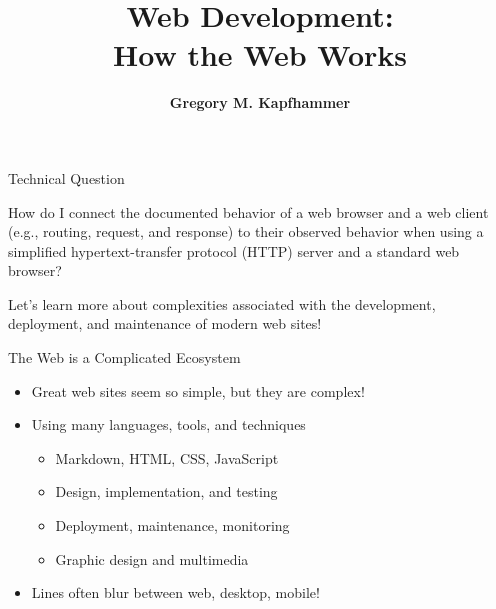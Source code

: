 \documentclass[14pt,aspectratio=169]{beamer}
\title{Web Development: \\ How the Web Works}
\author{{\bf Gregory M. Kapfhammer}}
\institute[shortinst]{{\bf Department of Computer Science, Allegheny College}}
\begin{document}
{
  \begin{frame}
    \titlepage
  \end{frame}
}

%
\begin{frame}{Technical Question}
  \hspace*{.25in}
  \vspace*{.2in}
  \begin{center}
    {\large How do I connect the documented behavior of a web browser and a
      web client (e.g., routing, request, and response) to their observed
      behavior when using a simplified hypertext-transfer protocol (HTTP) server
    and a standard web browser?}
  \end{center}
  \vspace{1ex}
  \begin{center}
    \small Let's learn more about complexities associated with the development,
    deployment, and maintenance of modern web sites!
  \end{center}
\end{frame}

%
\begin{frame}{The Web is a Complicated Ecosystem}
%
  \begin{itemize}
    \item Great web sites seem so simple, but they are complex!
    \item Using many languages, tools, and techniques
      \begin{itemize}
        \item Markdown, HTML, CSS, JavaScript
        \item Design, implementation, and testing
        \item Deployment, maintenance, monitoring
        \item Graphic design and multimedia
      \end{itemize}
    \item Lines often blur between web, desktop, mobile!
  \end{itemize}
%
\end{frame}
\end{document}
